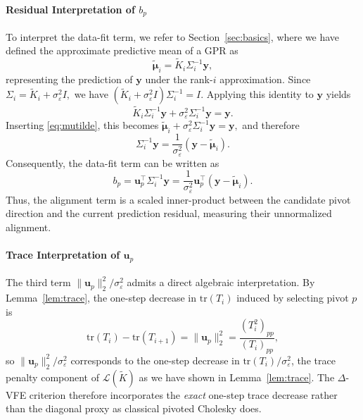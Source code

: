 \documentclass[onefignum,onetabnum]{siamart250211}
\newcommand{\tr}{\mathrm{tr}}
\begin{document}
\paragraph{Residual Interpretation of $b_p$}
To interpret the data-fit term, we refer to Section~\ref{sec:basics}, where we have defined the approximate predictive mean of a GPR as
\begin{equation}
    \bm{\tilde\mu}_i = \widetilde K_i \Sigma_i^{-1} \bm{y}, \label{eq:mutilde}
\end{equation}
representing the prediction of $\bm{y}$ under the rank-$i$ approximation.
Since $\Sigma_i = \widetilde K_i + \sigma_\varepsilon^2 I,$ we have $(\widetilde K_i + \sigma_\varepsilon^2 I)\Sigma_i^{-1} = I$. 
Applying this identity to $\bm{y}$ yields
\begin{equation*}
    \widetilde K_i \Sigma_i^{-1} \bm{y}
    + \sigma_\varepsilon^2 \Sigma_i^{-1} \bm{y}
    =
    \bm{y}. \label{eq:RLSdeltaVFE}
\end{equation*}
Inserting \eqref{eq:mutilde}, this becomes $\bm{\tilde\mu}_i+\sigma_\varepsilon^2 \Sigma_i^{-1} \bm{y}=\bm{y},$ and therefore
\begin{equation*}
    \Sigma_i^{-1} \bm{y}
    =
    \frac{1}{\sigma_\varepsilon^{2}}
    (\bm{y} - \bm{\tilde\mu}_i).
\end{equation*}
Consequently, the data-fit term can be written as
\begin{equation}
    b_p
    =
    \bm{u}_p^\top \Sigma_i^{-1} \bm{y}
    =
    \frac{1}{\sigma_\varepsilon^{2}}
    \bm{u}_p^\top (\bm{y} - \bm{\tilde\mu}_i). \label{eq:bReformulated}
\end{equation}
Thus, the alignment term is a scaled inner-product between the candidate pivot direction and the current prediction residual, measuring their unnormalized alignment.


\paragraph{Trace Interpretation of $\bm{u}_p$}
The third term $\|\bm{u}_p\|_2^2/\sigma_\varepsilon^2$ admits a direct algebraic interpretation. By Lemma~\ref{lem:trace}, the one-step decrease in $\tr(T_i)$ induced by selecting pivot $p$
is
\begin{equation*}
    \tr(T_i) - \tr(T_{i+1})
    = \|\bm{u}_p\|_2^2
    = \frac{(T_i^2)_{pp}}{(T_i)_{pp}},
\end{equation*}
so $\|\bm{u}_p\|_2^2/\sigma_\varepsilon^2$ corresponds to the one-step decrease in $\tr(T_i)/\sigma_\varepsilon^2$, the trace penalty component of $\mathcal{L}(\widetilde{K})$ as we have shown in Lemma~\ref{lem:trace}. 
The $\Delta$-VFE criterion therefore incorporates the \emph{exact} one-step trace decrease rather than the diagonal proxy as classical pivoted Cholesky does.
\end{document}
